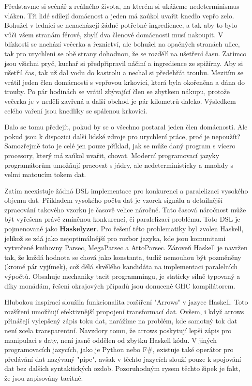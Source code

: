 \documentclass[male,czech]{kithesis}
\begin{document}
Představme si scénář z reálného života, 
na kterém si ukážeme nedeterminismus vláken.
Tři lidé sdílejí domácnost a 
jeden má zaúkol uvařit knedlo vepřo zelo.
Bohužel v lednici se nenacházejí žádné potřebné ingredience,
a tak aby to bylo vůči všem stranám férové,
zbylí dva členové domácnosti musí nakoupit.
V blízkosti se nachází večerka a řeznictví, 
ale bohužel na opačných stranách ulice, 
tak pro urychlení se obě strany dohodnou, 
že se rozdělí na ušetření času.
Zatímco jsou všichni pryč,
kuchař si předpřipravil náčiní a ingredience ze spižírny.
Aby si ušetřil čas, 
tak už dal vodu do kastrolu a nechal si předehřát troubu.
Mezitím se vrátil jeden člen domácnosti s vepřovou krkovicí,
která byla okořeněna a dána do trouby.
Po pár hodinách se vrátil zbývající člen se zbytkem nákupu, 
protože večerka je v neděli zavřená a 
další obchod je pár kilometrů daleko.
Výsledkem celého vaření jsou knedlíky se spálenou krkovicí.

Dalo se tomu předejít,
pokud by se o všechno postaral jeden člen domácnosti.
Ale pokud jsou k dispozici další lidské zdroje pro urychlení práce,
proč je nepoužít?
Samozřejmě toto je celé jen pouze příklad,
jak se může daný program s vícero procesory, 
který má zaúkol uvařit, chovat.
Moderní programovací jazyky programátorům umožňují pracovat s jádry,
ale nedeterministicky a mnohdy s velmi matoucím tokem dat. 

Zatím neexistuje žádná DSL implementace pro konkurenci a
paralelizaci vysokého objemu dat.
Příkladem vysokého počtu dat je vzorek signálu a 
detailnější zpracování takového vzorku je časově velice náročné. 
Tato časová náročnost může být vyřešena právě zmíněnou konkurencí, 
či paralelizací problému. 
Toto DSL je pojmenované jako \textbf{Haskelyzer}.
Pro řešení této problematiky byl zvolen Haskell, 
jelikož se zdá jako nejoptimálnější pro rozbor jazyka,
kde jsou komunitami vytvořené knihovny Parsec, MegaParsec a AttoParsec.
Zároveň Haskell je navržen tak, 
že každá hodnota se chová jako konstanta, 
tudíž nemouhou být pozměněny (kromě pár vyjímek),
což dělá skvělého kandidáta na implementaci paralelních výpočtů.
Obsahuje mechaniky tacit programmingu, 
je staticky silně typovaný a díky monádám, 
řešení okrajových případů jsou donucené GHC kompilátorem.

Hlubokou inspirací sloužila funkcionalita rozšíření "Arrows" 
v jazyce Haskell. %
Toto rozšíření umožňují efektivnější propojení transformací dat.
Ovšem,
i když arrows přinášejí vylepšený zápis toku dat,
narážíme na problém,
kde samotný tok dat není zcela transparentní.
Navzdory tomu,
že arrows poskytují lepší zápis pro manipulaci s daty,
není jasně oddělen od zbytku Haskell kódu.
V jiných programovacích jazycích,
jako je Python nebo F\#,
existuje také operátor pro předávání dat nazývaný "pipe",
avšak v těchto jazycích slouží pouze k spojování dat bez dalších syntaktických ozdob.
Pozoruhodným rysem těchto šipek je fakt,
že jsou zapisovány tacitně.
\end{document}
